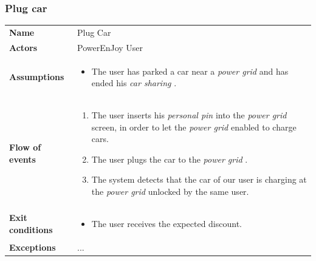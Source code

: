 \documentclass[english]{article}
\newcommand{\carsharing}{\textit {car sharing }}
\newcommand{\powergrid}{\textit{power grid }}
\newcommand{\personalpin}{\textit{personal pin }}
\begin{document}
\subsubsection{Plug car}
	\begin{center}
	\begin{tabular}{l||p{10cm}}
	\textbf{Name} 
		& Plug Car\\ [8px]
	\textbf{Actors} 
		& PowerEnJoy User\\ [8px]
	\textbf{Assumptions} 
	& \begin{itemize}
		\item The user has parked a car near a \powergrid and has ended his \carsharing. 
	\end{itemize}\\
	\textbf{Flow of events}
		& \begin{enumerate}
 			\item The user inserts his \personalpin into the \powergrid screen, in order to let the \powergrid enabled to charge cars.
			\item The user plugs the car to the \powergrid.
			\item The system detects that the car of our user is charging at the \powergrid unlocked by the same user. 
		\end{enumerate}\\ 
	\textbf{Exit conditions}
		&\begin{itemize}
			\item The user receives the expected discount.
		\end{itemize}\\
	\textbf{Exceptions}
		&...\\[8px]
	\end{tabular}
	\end{center}
\end{document}
